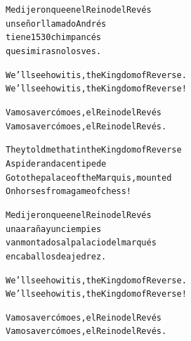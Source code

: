 \documentclass[11pt,a4paper]{article}
\begin{document}
\begin{parcolumns}[distance=8em,nofirstindent=true]{2}
\colchunk
{
\begin{alltt}\normalfont
Me dijeron que en el Reino del Revés
un señor llamado Andrés
tiene 1530 chimpancés
que si miras no los ves.
\end{alltt}
}

\colplacechunks

\colchunk
{
\begin{alltt}\normalfont
We’ll see how it is, the Kingdom of Reverse.
We’ll see how it is, the Kingdom of Reverse!
\end{alltt}
}

\colchunk
{
\begin{alltt}\normalfont
Vamos a ver cómo es, el Reino del Revés
Vamos a ver cómo es, el Reino del Revés.
\end{alltt}
}

\colplacechunks

\colchunk
{
\begin{alltt}\normalfont
They told me that in the Kingdom of Reverse
A spider and a centipede
Go to the palace of the Marquis, mounted
On horses from a game of chess!
\end{alltt}
}

\colchunk
{
\begin{alltt}\normalfont
Me dijeron que en el Reino del Revés
una araña y un ciempies
van montados al palacio del marqués
en caballos de ajedrez.
\end{alltt}
}

\colplacechunks

\colchunk
{
\begin{alltt}\normalfont
We’ll see how it is, the Kingdom of Reverse.
We’ll see how it is, the Kingdom of Reverse!
\end{alltt}
}

\colchunk
{
\begin{alltt}\normalfont
Vamos a ver cómo es, el Reino del Revés
Vamos a ver cómo es, el Reino del Revés.
\end{alltt}
}

\colplacechunks

\end{parcolumns}

\clearpage

\end{document}
